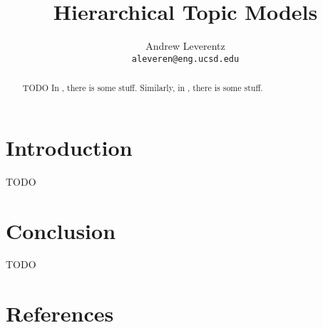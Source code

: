 \documentclass{article}
\title{Hierarchical Topic Models}
\author{
  Andrew Leverentz \\
  \texttt{aleveren@eng.ucsd.edu} \\
}
\begin{document}
\maketitle

\begin{abstract}
TODO
In \cite{paisley2015nested}, there is some stuff.
Similarly, in \cite{blei2010nested}, there is some stuff.
\end{abstract}

\section{Introduction}
TODO

\section{Conclusion}
TODO

\section*{References}
\small

\nocite{*}
%


\end{document}
